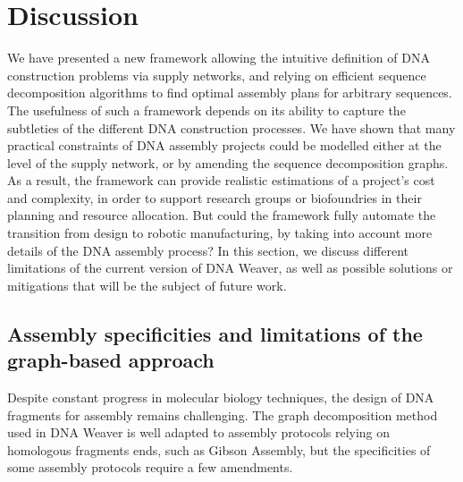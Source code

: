 \section{Discussion}

We have presented a new framework allowing the intuitive definition of DNA construction problems via supply networks, and relying on efficient sequence decomposition algorithms to find optimal assembly plans for arbitrary sequences. The usefulness of such a framework depends on its ability to capture the subtleties of the different DNA construction processes. We have shown that many practical constraints of DNA assembly projects could be modelled either at the level of the supply network, or by amending the sequence decomposition graphs. As a result, the framework can provide realistic estimations of a project's cost and complexity, in order to support research groups or biofoundries in their planning and resource allocation. But could the framework fully automate the transition from design to robotic manufacturing, by taking into account more details of the DNA assembly process? In this section, we discuss different limitations of the current version of DNA Weaver, as well as possible solutions or mitigations that will be the subject of future work.

\subsection{Assembly specificities and limitations of the graph-based approach}

Despite constant progress in molecular biology techniques, the design of DNA fragments for assembly remains challenging. The graph decomposition method used in DNA Weaver is well adapted to assembly protocols relying on homologous fragments ends, such as Gibson Assembly, but the specificities of some assembly protocols require a few amendments.

